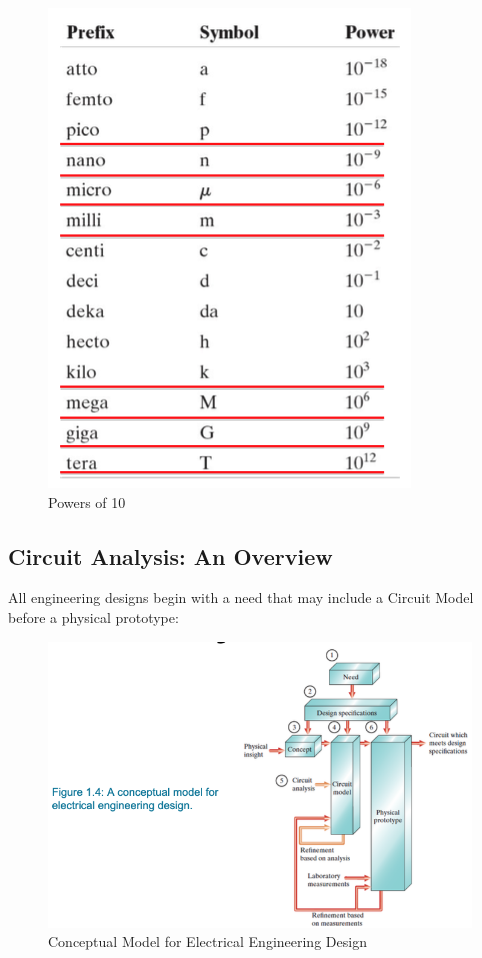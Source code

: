 \documentclass[14pt]{memoir}
\begin{document}
\begin{figure}[h]
\begin{center}
\includegraphics[scale=0.30]{fig/tab01_03.png}
\caption{Powers of 10}
\label{fig:t01_03}
\end{center}
\end{figure}

\subsection{Circuit Analysis: An Overview}

All engineering designs begin with a need that may include a Circuit Model before a physical prototype:

\begin{figure}[h]
\begin{center}
\includegraphics[scale=0.30]{fig/fig01_04.png}
\caption{Conceptual Model for Electrical Engineering Design}
\label{fig:f01_04}
\end{center}
\end{figure}
\end{document}
